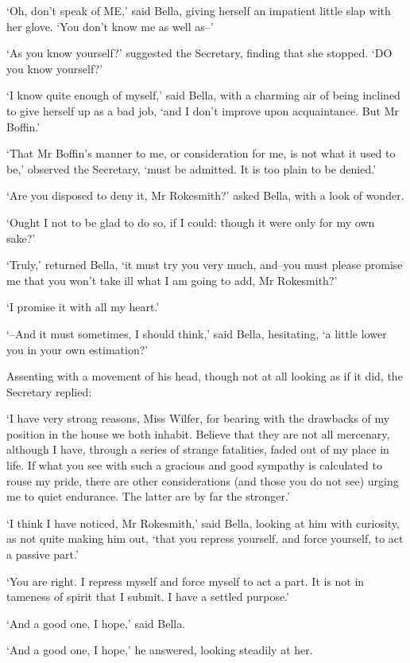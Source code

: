 ‘Oh, don’t speak of ME,’ said Bella, giving herself an impatient little
slap with her glove. ‘You don’t know me as well as--’

‘As you know yourself?’ suggested the Secretary, finding that she
stopped. ‘DO you know yourself?’

‘I know quite enough of myself,’ said Bella, with a charming air of
being inclined to give herself up as a bad job, ‘and I don’t improve
upon acquaintance. But Mr Boffin.’

‘That Mr Boffin’s manner to me, or consideration for me, is not what it
used to be,’ observed the Secretary, ‘must be admitted. It is too plain
to be denied.’

‘Are you disposed to deny it, Mr Rokesmith?’ asked Bella, with a look of
wonder.

‘Ought I not to be glad to do so, if I could: though it were only for my
own sake?’

‘Truly,’ returned Bella, ‘it must try you very much, and--you must
please promise me that you won’t take ill what I am going to add, Mr
Rokesmith?’

‘I promise it with all my heart.’

‘--And it must sometimes, I should think,’ said Bella, hesitating, ‘a
little lower you in your own estimation?’

Assenting with a movement of his head, though not at all looking as if
it did, the Secretary replied:

‘I have very strong reasons, Miss Wilfer, for bearing with the drawbacks
of my position in the house we both inhabit. Believe that they are not
all mercenary, although I have, through a series of strange fatalities,
faded out of my place in life. If what you see with such a gracious
and good sympathy is calculated to rouse my pride, there are other
considerations (and those you do not see) urging me to quiet endurance.
The latter are by far the stronger.’

‘I think I have noticed, Mr Rokesmith,’ said Bella, looking at him with
curiosity, as not quite making him out, ‘that you repress yourself, and
force yourself, to act a passive part.’

‘You are right. I repress myself and force myself to act a part. It is
not in tameness of spirit that I submit. I have a settled purpose.’

‘And a good one, I hope,’ said Bella.

‘And a good one, I hope,’ he answered, looking steadily at her.

